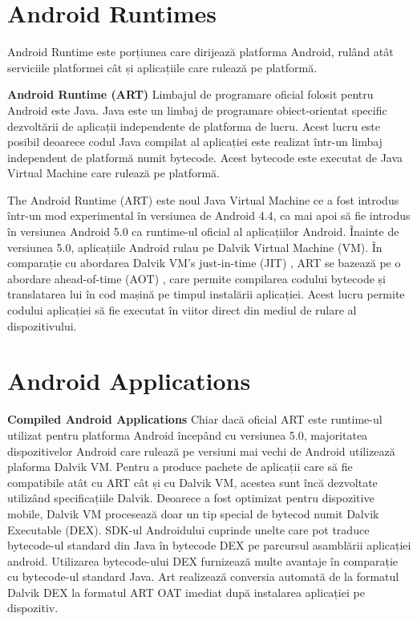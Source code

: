 \section{Android Runtimes}
\vspace{1cm}
Android Runtime este porțiunea care dirijează platforma Android, rulând atât serviciile platformei cât și aplicațiile care rulează pe platformă.\newline

\textbf{Android Runtime (ART)}
\newline
Limbajul de programare oficial folosit pentru Android este Java. Java este un limbaj de programare obiect-orientat specific dezvoltării de aplicații independente de platforma de lucru.
Acest lucru este posibil deoarece codul Java compilat al aplicației este realizat într-un limbaj independent de platformă numit bytecode. Acest bytecode este executat de Java Virtual Machine care rulează pe platformă.\newline

The Android Runtime (ART) este noul Java Virtual Machine ce a fost introdus într-un mod experimental în versiunea de Android 4.4, ca mai apoi să fie introdus în versiunea Android 5.0 ca runtime-ul oficial al aplicațiilor Android.  Înainte de versiunea 5.0, aplicațiile Android rulau pe Dalvik Virtual Machine (VM).\newline
În comparație cu abordarea Dalvik VM’s just-in-time (JIT) , ART se bazează pe o abordare ahead-of-time (AOT) , care permite compilarea codului bytecode și translatarea lui în cod mașină pe timpul instalării aplicației. Acest lucru permite codului aplicației să fie executat în viitor direct din mediul de rulare al dispozitivului.\cite{1}\newline

\section{Android Applications}
\vspace{1cm}
\textbf{Compiled Android Applications}\newline
Chiar dacă oficial ART este runtime-ul utilizat pentru platforma Android începând cu versiunea 5.0, majoritatea dispozitivelor Android care rulează pe versiuni mai vechi de Android utilizează plaforma Dalvik VM. \newline
Pentru a produce pachete de aplicații care să fie compatibile atât cu ART cât și cu Dalvik VM, acestea sunt încă dezvoltate utilizând specificațiile Dalvik. \newline Deoarece a fost optimizat pentru dispozitive mobile, Dalvik VM procesează doar un tip special de bytecod numit Dalvik Executable (DEX). SDK-ul Androidului cuprinde unelte care pot traduce bytecode-ul standard din Java în bytecode DEX pe parcursul asamblării aplicației android. Utilizarea bytecode-ului DEX furnizează multe avantaje în comparație cu bytecode-ul standard Java. Art realizează conversia automată de la formatul Dalvik DEX la formatul ART OAT imediat după instalarea aplicației pe dispozitiv.\cite{1}\newline


